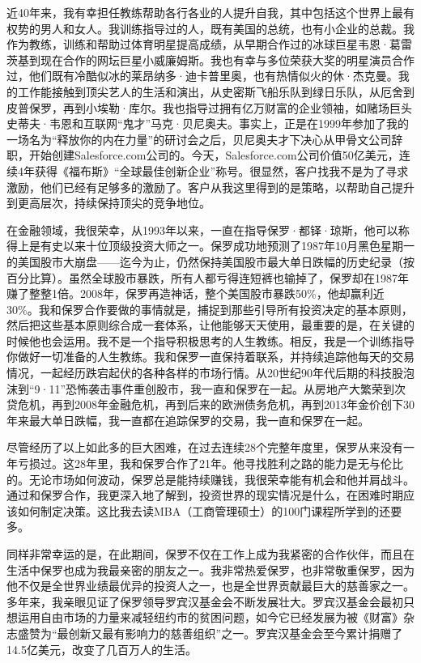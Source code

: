 近40年来，我有幸担任教练帮助各行各业的人提升自我，其中包括这个世界上最有权势的男人和女人。我训练指导过的人，既有美国的总统，也有小企业的总裁。我作为教练，训练和帮助过体育明星提高成绩，从早期合作过的冰球巨星韦恩·葛雷茨基到现在合作的网坛巨星小威廉姆斯。我也有幸与多位荣获大奖的明星演员合作过，他们既有冷酷似冰的莱昂纳多·迪卡普里奥，也有热情似火的休·杰克曼。我的工作能接触到顶尖艺人的生活和演出，从史密斯飞船乐队到绿日乐队，从厄舍到皮普保罗，再到小埃勒·库尔。我也指导过拥有亿万财富的企业领袖，如赌场巨头史蒂夫·韦恩和互联网“鬼才”马克·贝尼奥夫。事实上，正是在1999年参加了我的一场名为“释放你的内在力量”的研讨会之后，贝尼奥夫才下决心从甲骨文公司辞职，开始创建Salesforce.com公司的。今天，Salesforce.com公司价值50亿美元，连续4年获得《福布斯》“全球最佳创新企业”称号。很显然，客户找我不是为了寻求激励，他们已经有足够多的激励了。客户从我这里得到的是策略，以帮助自己提升到更高层次，持续保持顶尖的竞争地位。

在金融领域，我很荣幸，从1993年以来，一直在指导保罗·都铎·琼斯，他可以称得上是有史以来十位顶级投资大师之一。保罗成功地预测了1987年10月黑色星期一的美国股市大崩盘——迄今为止，仍然保持美国股市最大单日跌幅的历史纪录（按百分比算）。虽然全球股市暴跌，所有人都亏得连短裤也输掉了，保罗却在1987年赚了整整1倍。2008年，保罗再造神话，整个美国股市暴跌50\%，他却赢利近30\%。我和保罗合作要做的事情就是，捕捉到那些引导所有投资决定的基本原则，然后把这些基本原则综合成一套体系，让他能够天天使用，最重要的是，在关键的时候他也会运用。我不是一个指导积极思考的人生教练。相反，我是一个训练指导你做好一切准备的人生教练。我和保罗一直保持着联系，并持续追踪他每天的交易情况，一起经历跌宕起伏的各种各样的市场行情。从20世纪90年代后期的科技股泡沫到“9·11”恐怖袭击事件重创股市，我一直和保罗在一起。从房地产大繁荣到次贷危机，再到2008年金融危机，再到后来的欧洲债务危机，再到2013年金价创下30年来最大单日跌幅，我一直都在追踪保罗的交易，我一直和保罗在一起。

尽管经历了以上如此多的巨大困难，在过去连续28个完整年度里，保罗从来没有一年亏损过。这28年里，我和保罗合作了21年。他寻找胜利之路的能力是无与伦比的。无论市场如何波动，保罗总是能持续赚钱，我很荣幸能有机会和他并肩战斗。通过和保罗合作，我更深入地了解到，投资世界的现实情况是什么，在困难时期应该如何制定决策。这比我去读MBA（工商管理硕士）的100门课程所学到的还要多。

同样非常幸运的是，在此期间，保罗不仅在工作上成为我紧密的合作伙伴，而且在生活中保罗也成为我最亲密的朋友之一。我非常热爱保罗，也非常敬重保罗，因为他不仅是全世界业绩最优异的投资人之一，也是全世界贡献最巨大的慈善家之一。多年来，我亲眼见证了保罗领导罗宾汉基金会不断发展壮大。罗宾汉基金会最初只想运用自由市场的力量来减轻纽约市的贫困问题，如今它已经发展为被《财富》杂志盛赞为“最创新又最有影响力的慈善组织”之一。罗宾汉基金会至今累计捐赠了14.5亿美元，改变了几百万人的生活。

